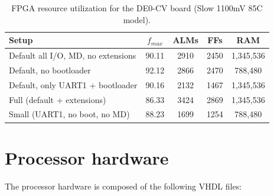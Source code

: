 \documentclass[12pt]{article}
\begin{document}
\begin{table}[!ht]
\caption{FPGA resource utilization for the DE0-CV board (Slow 1100mV 85C model).}
\label{tab:util}
\centering
\begin{tabular}{p{6cm}cccc}
\toprule
Setup & $f_{max}$ & ALMs & FFs & RAM \\
\midrule
Default {all I/O, MD, no extensions} & 90.11 & 2910 & 2450 & 1,345,536 \\
Default, no bootloader               & 92.12 & 2866 & 2470 & 788,480 \\
Default, only UART1 + bootloader     & 90.16 & 2132 & 1467 & 1,345,536 \\
Full (default + extensions)          & 86.33 & 3424 & 2869 & 1,345,536 \\
Small (UART1, no boot, no MD)        & 88.23 & 1699 & 1254 & 788,480 \\ 
\bottomrule
\end{tabular}
\end{table}



\section{Processor hardware}
\label{sec:hardware}
The processor hardware is composed of the following VHDL files:
\end{document}
